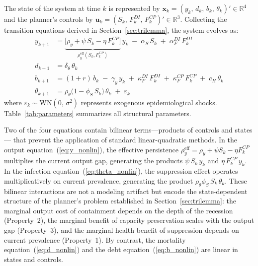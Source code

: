 \documentclass[12pt, a4paper]{article}
\begin{document}
The state of the system at time $k$ is represented by
$\bm{x}_k = (y_k,\, d_k,\, b_k,\, \theta_k)' \in \mathbb{R}^4$ and the planner's
controls by $\bm{u}_k = (S_k,\, F_k^{DI},\, F_k^{CP})' \in \mathbb{R}^3$.
Collecting the transition equations derived in Section~\ref{sec:trilemma}, the system
evolves as:
%
\begin{align}
    y_{k+1} &= \underbrace{\bigl[\rho_y + \psi\, S_k
    - \eta\, F_k^{CP}\bigr]}_{\rho_y^{\text{eff}}(S_k, F_k^{CP})}\, y_k
    \;-\; \alpha_S\, S_k \;+\; \alpha_F^{DI}\, F_k^{DI}
    \label{eq:y_nonlin} \\[1ex]
    d_{k+1} &= \delta_\theta\, \theta_k
    \label{eq:d_nonlin} \\[1ex]
    b_{k+1} &= (1+r)\, b_k \;-\; \gamma_y\, y_k
    \;+\; \kappa_F^{DI}\, F_k^{DI} \;+\; \kappa_F^{CP}\, F_k^{CP}
    \;+\; c_H\, \theta_k
    \label{eq:b_nonlin} \\[1ex]
    \theta_{k+1} &= \rho_\theta\bigl(1 - \phi_S\, S_k\bigr)\,\theta_k
    \;+\; \varepsilon_k
    \label{eq:theta_nonlin}
\end{align}
%
where $\varepsilon_k \sim \text{WN}(0,\, \sigma^2)$ represents exogenous
epidemiological shocks. Table~\ref{tab:parameters} summarizes all structural
parameters.

Two of the four equations contain bilinear terms---products of controls and states---
that prevent the application of standard linear-quadratic methods. In the output
equation~(\ref{eq:y_nonlin}), the effective persistence
$\rho_y^{\text{eff}} = \rho_y + \psi S_k - \eta F_k^{CP}$ multiplies the current
output gap, generating the products $\psi\, S_k\, y_k$ and $\eta\, F_k^{CP}\, y_k$.
In the infection equation~(\ref{eq:theta_nonlin}), the suppression effect operates
multiplicatively on current prevalence, generating the product
$\rho_\theta \phi_S\, S_k\, \theta_k$. These bilinear interactions are not a modeling
artifact but encode the state-dependent structure of the planner's problem established
in Section~\ref{sec:trilemma}: the marginal output cost of containment depends on the
depth of the recession (Property~2), the marginal benefit of capacity preservation
scales with the output gap (Property~3), and the marginal health benefit of
suppression depends on current prevalence (Property~1). By contrast, the mortality
equation~(\ref{eq:d_nonlin}) and the debt equation~(\ref{eq:b_nonlin}) are linear in
states and controls.
\end{document}
